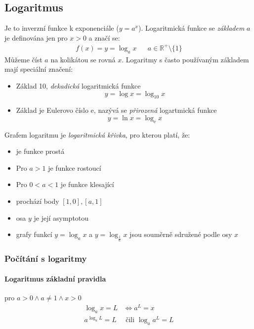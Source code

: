 \documentclass[12pt]{article}
\newcommand{\euler}{\mathrm{e}} %
\newcommand{\nR}{\mathbb{R}} %
\begin{document}
\subsection{Logaritmus}
Je to inverzní funkce k exponenciále ($y = a^x$). Logaritmická funkce se \emph{základem} $a$ je definována jen pro $x>0$ a značí se:
\begin{align}
f(x) =y = \log_a x && a \in \nR^+ \setminus \{ 1 \}
\end{align}
Můžeme číst $a$ na kolikátou se rovná $x$. Logaritmy s často používaným základem mají speciální značení:
\begin{itemize}
\item Základ 10, \emph{dekadická} logaritmická funkce
\begin{equation}
y = \log x = \log_10 x
\end{equation}
\item Základ je Eulerovo číslo $\euler$, nazývá se \emph{přirozená} logartmická funkce
\begin{equation}
y = \ln x = \log_{\euler} x
\end{equation}
\end{itemize}
Grafem logaritmu je \emph{logaritmická křivka}, pro kterou platí, že:
\begin{itemize}
\item je funkce prostá
\item Pro $a>1$ je funkce rostoucí
\item Pro $0<a<1$ je funkce klesající
\item prochází body $[1,0],[a,1]$
\item osa $y$ je její asymptotou
\item grafy funkcí $y = \log_a x$ a $y = \log_{\frac{1}{a}} x$ jsou souměrně sdružené podle osy $x$
\end{itemize}
\subsubsection{Počítání s logaritmy}
\paragraph{Logaritmus základní pravidla} pro $a>0 \land a \neq 1 \land x>0$
\begin{align}
\log_a x = L &\iff  a^L = x\\
a^{\log_a L} = L &\text{	čili	} \log_a a^L = L
\end{align}
\end{document}
